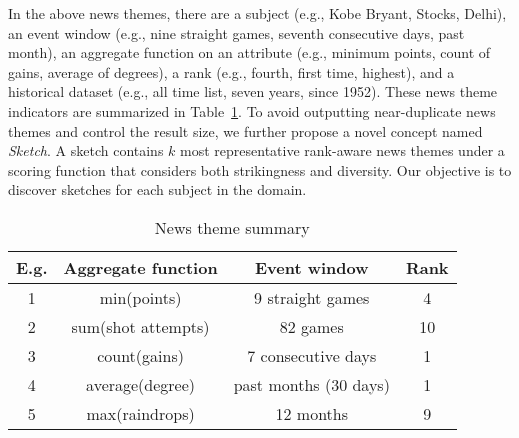 In the above news themes, there are a subject (e.g., Kobe Bryant, Stocks, Delhi), an event window (e.g., nine straight games, seventh consecutive days, past month), an aggregate function on an attribute
(e.g., minimum points, count of gains, average of degrees), a rank (e.g., fourth, first time, highest), and a
historical dataset (e.g., all time list, seven years, since 1952). These news theme indicators are summarized in Table~\ref{tbl:news-example}. 
To avoid outputting near-duplicate news themes and control the result size,
we further propose a novel concept named \emph{Sketch}. A sketch contains $k$ most representative rank-aware news themes under a scoring function that considers both strikingness and diversity. 
Our objective is to discover sketches for each subject in the domain.




\begin{table}[t]
\centering
\begin{tabular}{|c|c|c|c|}
\hline
\textbf{E.g.} & \textbf{Aggregate function} & \textbf{Event window} & \textbf{Rank} \\
\hline
1 & min(points) & 9 straight games & 4 \\
\hline
2 & sum(shot attempts) & 82 games & 10 \\
\hline
3 & count(gains) & 7 consecutive days & 1 \\
\hline
4 & average(degree) & past months (30 days) & 1 \\
\hline
5 & max(raindrops) & 12 months & 9 \\
\hline
\end{tabular}
\caption{News theme summary}
\label{tbl:news-example}
\end{table}

